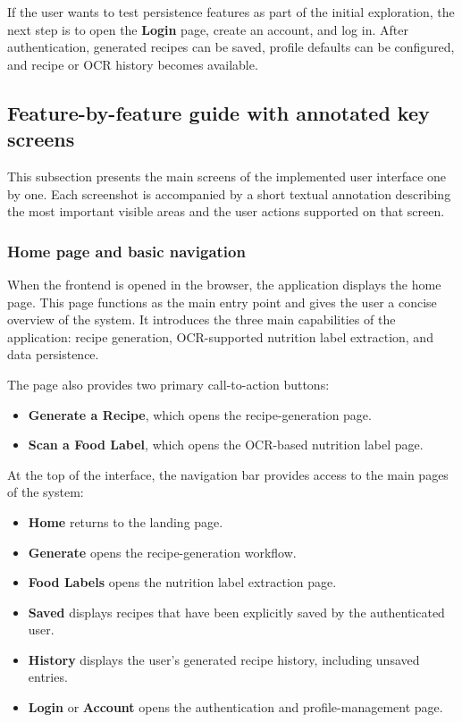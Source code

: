 If the user wants to test persistence features as part of the initial
exploration, the next step is to open the \textbf{Login} page, create
an account, and log in. After authentication, generated recipes can be
saved, profile defaults can be configured, and recipe or OCR history
becomes available.

\subsection{Feature-by-feature guide with annotated key screens}

This subsection presents the main screens of the implemented user
interface one by one. Each screenshot is accompanied by a short
textual annotation describing the most important visible areas and the
user actions supported on that screen.

\subsubsection{Home page and basic navigation}

When the frontend is opened in the browser, the application displays
the home page. This page functions as the main entry point and gives
the user a concise overview of the system. It introduces the three
main capabilities of the application: recipe generation,
OCR-supported nutrition label extraction, and data persistence.

The page also provides two primary call-to-action buttons:

\begin{itemize}
	\item \textbf{Generate a Recipe}, which opens the recipe-generation
	page.
	\item \textbf{Scan a Food Label}, which opens the OCR-based nutrition
	label page.
\end{itemize}

At the top of the interface, the navigation bar provides access to the
main pages of the system:

\begin{itemize}
	\item \textbf{Home} returns to the landing page.
	\item \textbf{Generate} opens the recipe-generation workflow.
	\item \textbf{Food Labels} opens the nutrition label extraction page.
	\item \textbf{Saved} displays recipes that have been explicitly saved
	by the authenticated user.
	\item \textbf{History} displays the user's generated recipe history,
	including unsaved entries.
	\item \textbf{Login} or \textbf{Account} opens the authentication and
	profile-management page.
\end{itemize}

